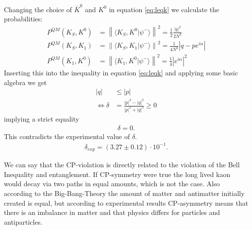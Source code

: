 \documentclass[a4paper]{article}
\begin{document}
Changing the choice of $\bar{K}^0$ and $K^0$ in equation \ref{eq:leqk} we
calculate the probabilities:
\begin{align}
    P^{QM}(K_S, K^0)&=\left\|\langle K_S, K^0|\psi ^-\rangle\right\|
    ^2=\frac{1}{2}\frac{|q|^2}{2N^2} \\
    P^{QM}(K_S, K_1)&= \left\|\langle K_S, K_1|\psi ^-\rangle\right\|^2=
    \frac{1}{4N^2}\left|q-pe^{i\alpha}\right|\\
    P^{QM}(K_1, K^0)&=\left\|\langle K_1, K^0|\psi ^-\rangle\right\| ^2=
    \frac{1}{4}|e^{i\alpha}|^2
\end{align}
Inserting this into the inequality in equation \ref{eq:leqk} and applying some
basic algebra we get
\begin{align}
    |q| &\leq |p|\\
    \Leftrightarrow \delta &= \frac{|p|^2 - |q|^2}{|p|^2+|q|^2} \geq 0
\end{align}
implying a strict equality
\begin{align}
        \delta = 0.
\end{align}
This contradicts the experimental value of $\delta$.
\begin{align}
    \delta_{exp} = (3.27\pm 0.12)\cdot 10^{-1}.
\end{align}

We can say that the CP-violation is directly related to the violation of the
Bell Inequality and entanglement.
If CP-symmetry were true the long lived kaon would decay via two paths in equal
amounts, which is not the case. Also
according to the Big-Bang-Theory the amount
of matter and antimatter initially created is equal, but according to
experimental results CP-asymmetry means that there is an imbalance in
matter and that physics differs for particles and antiparticles.




\printbibliography
\end{document}
